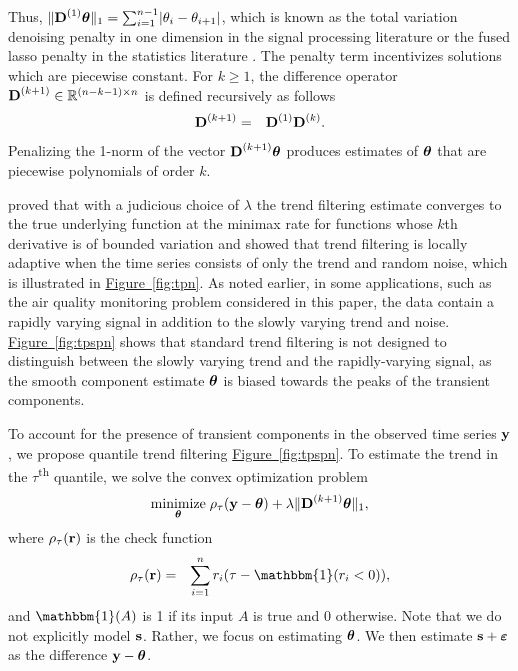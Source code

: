 \documentclass[aoas]{imsart}
\newcommand{\Fig}[1]{\hyperref[fig:#1]{Figure~\ref*{fig:#1}}} %
\newcommand{\Fig}[1]{{Figure~\ref{fig:#1}}} %
\newcommand{\Real}{\mathbb{R}}
\newcommand{\One}{\mathbbm{1}}
\newcommand{\V}[1]{{\bm{\mathbf{\MakeLowercase{#1}}}}} %
\newcommand{\VE}[2]{\MakeLowercase{#1}_{#2}} %
\newcommand{\M}[1]{{\bm{\mathbf{\MakeUppercase{#1}}}}} %
\newcommand{\Mn}[2]{\M{#1}^{(#2)}} %
\begin{document}
Thus, $\lVert \Mn{D}{1}\V{\theta} \rVert_1 = \sum_{i=1}^{n-1} \lvert \theta_i - \theta_{i+1} \rvert$, which is known as the total variation denoising penalty in one dimension in the signal processing literature \citep{Rudin1992} or the fused lasso penalty in the statistics literature \citep{Tibshirani2005}. The penalty term incentivizes solutions which are piecewise constant. For $k \geq 1$, the difference operator $\Mn{D}{k+1} \in \Real^{(n-k-1) \times n}$ is defined recursively as follows
\begin{eqnarray*}
	\Mn{D}{k+1} & = & \Mn{D}{1}\Mn{D}{k}.
\end{eqnarray*}
Penalizing the 1-norm of the vector $\Mn{D}{k+1}\V{\theta}$ produces estimates of $\V{\theta}$ that are piecewise polynomials of order $k$.

\cite{Tib2014} proved that with a judicious choice of $\lambda$ the trend filtering estimate converges to the true underlying function at the minimax rate for functions whose $k$th derivative is of bounded variation and showed that trend filtering is locally adaptive when the time series consists of only the trend and random noise, which is illustrated in \Fig{tpn}. As noted earlier, in some applications, such as the air quality monitoring problem considered in this paper, the data contain a rapidly varying signal in addition to the slowly varying trend and noise. \Fig{tpspn} shows that standard trend filtering is not designed to distinguish between the slowly varying trend and the rapidly-varying signal, as the smooth component estimate $\V{\theta}$ is biased towards the peaks of the transient components.

To account for the presence of transient components in the observed time series $\V{y}$, we propose quantile trend filtering \Fig{tpspn}. %
To estimate the trend in the $\tau$\textsuperscript{th} quantile, we solve the convex optimization problem
\begin{eqnarray}
\label{eq:quantile_trend}
\underset{\V{\theta}}{\text{minimize}}\; \rho_\tau(\V{y} - \V{\theta}) + \lambda \lVert \Mn{D}{k+1} \V{\theta} \rVert_1,
\end{eqnarray}
where $\rho_\tau(\V{r})$ is the check function
\begin{eqnarray}
\label{eq:check}
\rho_{\tau}(\V{r}) & = & \sum_{i=1}^n \VE{r}{i}(\tau-\One(\VE{r}{i}<0)),
\end{eqnarray}
and $\One(A)$ is 1 if its input $A$ is true and 0 otherwise. Note that we do not explicitly model $\V{s}$. Rather, we focus on estimating $\V{\theta}$. We then estimate $\V{s} + \V{\varepsilon}$ as the difference $\V{y} - \V{\theta}$.
\end{document}
